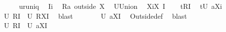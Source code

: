 \begin{isabellebody}
%
\isadelimproof
%
\endisadelimproof
%
\isatagproof
{}\isamarkupfalse%
\ {\isacharminus}\isanewline
\ \ \isamarkupfalse%
\ {\isacharquery}u{\isacharequal}runiq\ \isamarkupfalse%
\ {\isacharquery}I{\isacharequal}{\isachardoublequoteopen}{\isacharbraceleft}i{\isacharbraceright}{\isachardoublequoteclose}\ \isamarkupfalse%
\ {\isacharquery}R{\isacharequal}{\isachardoublequoteopen}a\ outside\ X{\isachardoublequoteclose}\ \isamarkupfalse%
\ {\isacharquery}U{\isacharequal}Union\ \isamarkupfalse%
\ {\isacharquery}Xi{\isacharequal}{\isachardoublequoteopen}X\ {\isasymunion}{\isacharquery}I{\isachardoublequoteclose}\isanewline
\ \ \isamarkupfalse%
\ {\isacharquery}t{}{\isacharequal}{\isachardoublequoteopen}{\isacharquery}R{\isacharbackquote}{\isacharbackquote}{\isacharquery}I{\isachardoublequoteclose}\ \isamarkupfalse%
\ {\isacharquery}t{}{\isacharequal}{\isachardoublequoteopen}{\isacharbraceleft}{\isacharquery}U\ {\isacharparenleft}a{\isacharbackquote}{\isacharbackquote}{\isacharquery}Xi{\isacharparenright}{\isacharbraceright}{\isachardoublequoteclose}\isanewline
\ \ \isamarkupfalse%
\ {\isachardoublequoteopen}{\isacharquery}U\ {\isacharparenleft}{\isacharquery}R{\isacharbackquote}{\isacharbackquote}{\isacharquery}I{\isacharparenright}\ {\isasymsubseteq}\ {\isacharquery}U\ {\isacharparenleft}{\isacharquery}R{\isacharbackquote}{\isacharbackquote}{\isacharparenleft}X{\isasymunion}{\isacharquery}I{\isacharparenright}{\isacharparenright}{\isachardoublequoteclose}\ \isamarkupfalse%
\ blast\isanewline
\ \ \isamarkupfalse%
\ \isamarkupfalse%
\ {\isachardoublequoteopen}{\isachardot}{\isachardot}{\isachardot}\ {\isasymsubseteq}\ {\isacharquery}U\ {\isacharparenleft}a{\isacharbackquote}{\isacharbackquote}{\isacharparenleft}X{\isasymunion}{\isacharquery}I{\isacharparenright}{\isacharparenright}{\isachardoublequoteclose}\ \isamarkupfalse%
\ Outside{\isacharunderscore}def\ \isamarkupfalse%
\ blast\isanewline
\ \ \isamarkupfalse%
\ \isamarkupfalse%
\ {\isachardoublequoteopen}{\isacharquery}U\ {\isacharparenleft}{\isacharquery}R{\isacharbackquote}{\isacharbackquote}{\isacharquery}I{\isacharparenright}\ {\isasymsubseteq}\ {\isacharquery}U\ {\isacharparenleft}a{\isacharbackquote}{\isacharbackquote}{\isacharparenleft}X{\isasymunion}{\isacharquery}I{\isacharparenright}{\isacharparenright}{\isachardoublequoteclose}\ \isamarkupfalse%

\end{isabellebody}
